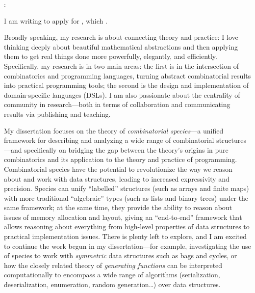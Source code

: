 \begin{letter}{\thereaddress}

\opening{\salutation:}

I am writing to apply for \position, which \foundon.  \opportunity

\ifresearch
Broadly speaking, my research is about connecting theory and practice:
I love thinking deeply about beautiful mathematical abstractions and
then applying them to get real things done more powerfully, elegantly,
and efficiently.  Specifically, my research is in two main areas: the
first is in the intersection of combinatorics and programming
languages, turning abstract combinatorial results into practical
programming tools; the second is the design and implementation of
domain-specific languages (DSLs). I am also passionate about the
centrality of community in research---both in terms of collaboration
and communicating results via publishing and teaching.

My dissertation focuses on the theory of \emph{combinatorial
  species}---a unified framework for describing and analyzing a wide
range of combinatorial structures---and specifically on bridging the
gap between the theory's origins in pure combinatorics and its
application to the theory and practice of programming.  Combinatorial
species have the potential to revolutionize the way we reason about
and work with data structures, leading to increased expressivity and
precision.  Species can unify ``labelled'' structures (such as arrays
and finite maps) with more traditional ``algebraic'' types (such as
lists and binary trees) under the same framework; at the same time,
they provide the ability to reason about issues of memory allocation
and layout, giving an ``end-to-end'' framework that allows reasoning
about everything from high-level properties of data structures to
practical implementation issues.  There is plenty left to explore, and
I am excited to continue the work begun in my dissertation---for
example, investigating the use of species to work with
\emph{symmetric} data structures such as bags and cycles, or how the
closely related theory of \emph{generating functions} can be
interpreted computationally to encompass a wide range of algorithms
(serialization, deserialization, enumeration, random generation\dots)
over data structures.


\end{letter}
